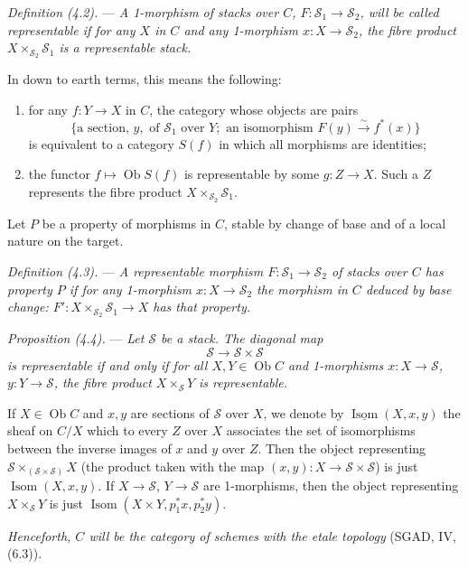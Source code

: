 \documentclass[10pt]{article}
\newcommand{\Isom}{\operatorname{Isom}}
\begin{document}
\medskip
\noindent\emph{Definition (4.2).} --- \emph{A 1-morphism of stacks over $C$, $F:\mathscr S_1\to\mathscr S_2$, will be called representable if for any $X$ in $C$ and any 1-morphism $x:X\to\mathscr S_2$, the fibre product $X\times_{\mathscr S_2}\mathscr S_1$ is a representable stack.}

In down to earth terms, this means the following:
\begin{enumerate}[label=(\roman*)]
\item for any $f:Y\to X$ in $C$, the category whose objects are pairs
\[
\{\text{a section, }y,\text{ of }\mathscr S_1\text{ over }Y;\text{ an isomorphism }F(y)\xrightarrow{\sim}f^*(x)\}
\]
is equivalent to a category $S(f)$ in which all morphisms are identities;
\item the functor $f\mapsto\operatorname{Ob} S(f)$ is representable by some $g:Z\to X$. Such a $Z$ represents the fibre product $X\times_{\mathscr S_2}\mathscr S_1$.
\end{enumerate}

Let $P$ be a property of morphisms in $C$, stable by change of base and of a local nature on the target.

\medskip
\noindent\emph{Definition (4.3).} --- \emph{A representable morphism $F:\mathscr S_1\to\mathscr S_2$ of stacks over $C$ has property $P$ if for any 1-morphism $x:X\to\mathscr S_2$ the morphism in $C$ deduced by base change: $F':X\times_{\mathscr S_2}\mathscr S_1\to X$ has that property.}

\medskip
\noindent\emph{Proposition (4.4).} --- \emph{Let $\mathscr S$ be a stack. The diagonal map}
\[
\mathscr S\to\mathscr S\times\mathscr S
\]
\emph{is representable if and only if for all $X,Y\in\operatorname{Ob} C$ and 1-morphisms $x:X\to\mathscr S$, $y:Y\to\mathscr S$, the fibre product $X\times_{\mathscr S}Y$ is representable.}

If $X\in\operatorname{Ob} C$ and $x,y$ are sections of $\mathscr S$ over $X$, we denote by $\underline{\Isom}(X,x,y)$ the sheaf on $C/X$ which to every $Z$ over $X$ associates the set of isomorphisms between the inverse images of $x$ and $y$ over $Z$. Then the object representing $\mathscr S\times_{(\mathscr S\times\mathscr S)}X$ (the product taken with the map $(x,y):X\to\mathscr S\times\mathscr S$) is just $\Isom(X,x,y)$. If $X\to\mathscr S$, $Y\to\mathscr S$ are 1-morphisms, then the object representing $X\times_{\mathscr S}Y$ is just $\Isom(X\times Y,p_1^*x,p_2^*y)$.

\emph{Henceforth, $C$ will be the category of schemes with the etale topology} (SGAD, IV, (6.3)).
\end{document}
